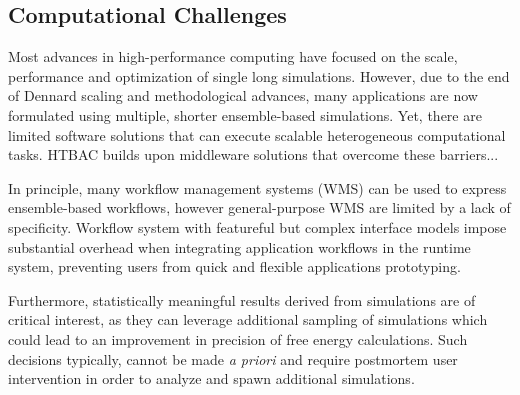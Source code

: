 \subsection{Computational Challenges}

Most advances in high-performance computing have focused on the scale,
performance and optimization of single long simulations. However, due to the
end of Dennard scaling and methodological advances, many applications are now
formulated using multiple, shorter ensemble-based simulations. Yet, there are
limited software solutions that can execute scalable heterogeneous
computational tasks. HTBAC builds upon middleware solutions that overcome
these barriers...






In principle, many workflow management systems (WMS) can be used to express
ensemble-based workflows, however general-purpose WMS are limited by a lack of
specificity. Workflow system with featureful but complex interface models
impose substantial overhead when integrating application workflows in the
runtime system, preventing users from quick and flexible applications
prototyping. 

Furthermore, statistically meaningful results derived from simulations are of
critical interest, as they can leverage additional sampling of simulations
which could lead to an improvement in precision of free energy calculations.
Such decisions typically, cannot be made {\it a priori} and require postmortem
user intervention in order to analyze and spawn additional simulations.

